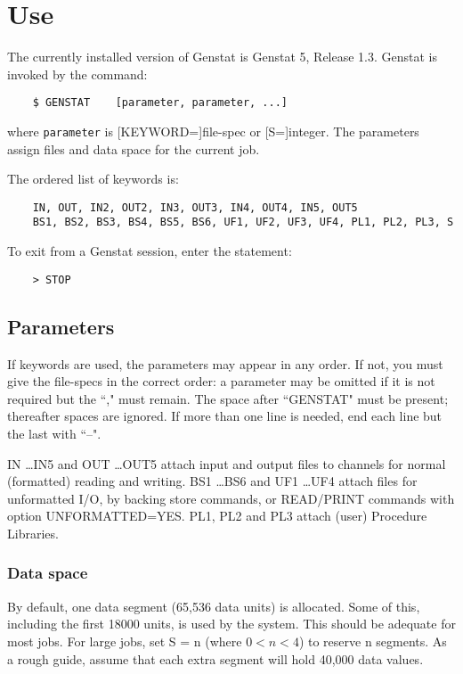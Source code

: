 \section{Use}

The currently installed version of Genstat is Genstat 5, Release 1.3.
Genstat is invoked by the command:
\begin{verbatim}
    $ GENSTAT    [parameter, parameter, ...]
\end{verbatim}
where {\tt parameter} is [KEYWORD=]file-spec or [S=]integer.
The parameters assign files and data space for the current job.

The ordered list of keywords is:
\begin{verbatim}
    IN, OUT, IN2, OUT2, IN3, OUT3, IN4, OUT4, IN5, OUT5
    BS1, BS2, BS3, BS4, BS5, BS6, UF1, UF2, UF3, UF4, PL1, PL2, PL3, S
\end{verbatim}
To exit from a Genstat session, enter the statement:
\begin{verbatim}
    > STOP
\end{verbatim}
\subsection{Parameters}

If keywords are used, the parameters may appear in any order.
If not, you must give the file-specs in the correct order: a parameter may be
omitted if it is not required but the ``," must remain.
The space after ``GENSTAT" must be present; thereafter spaces are ignored.
If more than one line is needed, end each line but the last with ``--".

IN \ldots IN5 and OUT \ldots OUT5 attach input and output files to channels
for normal (formatted) reading and writing.
BS1 \dots BS6 and UF1 \dots UF4 attach files for unformatted I/O, by backing
store commands, or READ/PRINT commands with option UNFORMATTED=YES.
PL1, PL2 and PL3 attach (user) Procedure Libraries.

\subsubsection{Data space}

By default, one data segment (65,536 data units) is allocated.
Some of this, including the first 18000 units, is used by the system.
This should be adequate for most jobs.
For large jobs, set S = n (where $0<n<4$) to reserve n segments.
As a rough guide, assume that each extra segment will hold 40,000 data values.

